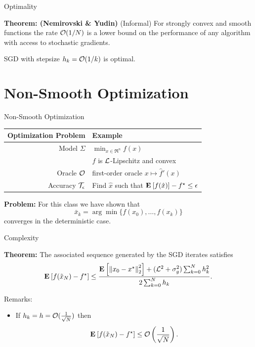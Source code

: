 \documentclass[9pt]{beamer}
\begin{document}
\begin{frame}{Optimality}

  \textbf{Theorem: (Nemirovski \& Yudin) } (Informal) For strongly convex and smooth functions the rate $\mathcal O(1/N)$ is a lower bound on the performance of any algorithm with access to stochastic gradients.

  \vfill

  SGD with stepsize $h_k=\mathcal O(1/k)$ is optimal.
  
\end{frame}

\section{Non-Smooth Optimization}

\begin{frame}{Non-Smooth Optimization}

    \begin{center}
    \begin{tabular}{r|l}
      \hline
      Optimization Problem & Example \\[0.5em]
      \hline
      Model $\Sigma$ & $\min_{x\in \Re^n} f(x)$ \\[0.5em]
                           & $f$ is $\mathcal L$-Lipschitz and convex\\[0.5em]
      Oracle $\mathcal O$ & first-order oracle $x \mapsto \hat f'(x)$\\[0.5em]
      Accuracy $\mathcal T_\epsilon$ & Find $\hat x$ such that $\mathbf{E}_{} \left[ f(\hat x) \right]-f^\star\leq\epsilon$\\[0.5em]
      \hline
    \end{tabular}
  \end{center}

  \vfill

  \textbf{Problem:} For this class we have shown that
  \[
    \bar x_k = \arg\min \{f(x_0), \dots, f(x_k)\}
  \]
  converges in the deterministic case.

  \vfill
  
\end{frame}


\begin{frame}{Complexity}

  \textbf{Theorem:} The associated sequence generated by the SGD iterates satisfies
  \[
    \mathbf{E}_{} \left[ f(\tilde x_N)-f^\star \right]\leq \frac{\mathbf{E}_{} \left[ \left\|x_0-x^\star\right\|_2^2 \right]+(\mathcal L^2+\sigma_g^2) \sum_{k=0}^N h^2_k}{2\sum_{k=0}^N h_k}.
  \]

  \vfill
  Remarks:
  \begin{itemize}
  \item If $h_k=h=\mathcal O(\frac {1}{\sqrt N})$ then
    \[
      \mathbf{E}_{} \left[ f(\tilde x_N)-f^\star \right]\leq \mathcal O\left(\frac{1}{\sqrt{N}}\right).
    \]
  \end{itemize}
  
\end{frame}
\end{document}
